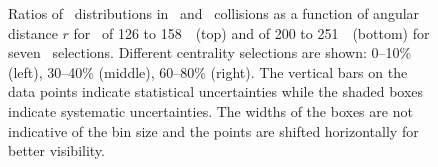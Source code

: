\begin{figure}[h]
{\begin{tabular}{ccc}
\end{tabular}
}
\caption{Ratios of \Dptr\ distributions in \PbPb\ and \pp\ collisions as a function of angular distance $r$ for \ptjet\ of 126 to 158~\GeV\ (top) and of 200 to 251~\GeV\ (bottom) for seven \pt\ selections.
Different centrality selections are shown: 0--10\% (left), 30--40\% (middle), 60--80\% (right).
The vertical bars on the data points indicate statistical uncertainties while the shaded boxes indicate systematic uncertainties.
The widths of the boxes are not indicative of the bin size and the points are shifted horizontally for better visibility.}
\label{fig:rdptr}
\end{figure}

